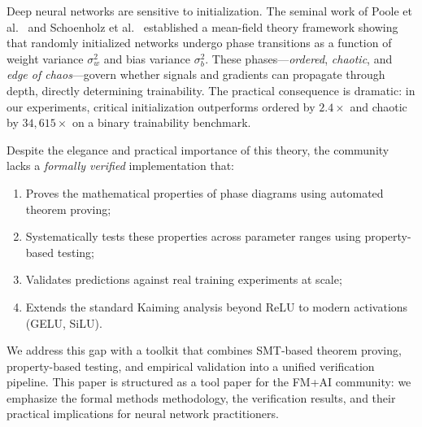 \documentclass[10pt]{article}
\begin{document}
Deep neural networks are sensitive to initialization.
The seminal work of Poole et al.~\cite{poole2016exponential} and Schoenholz et al.~\cite{schoenholz2017deep} established a mean-field theory framework showing that randomly initialized networks undergo phase transitions as a function of weight variance $\sigma_w^2$ and bias variance $\sigma_b^2$.
These phases---\emph{ordered}, \emph{chaotic}, and \emph{edge of chaos}---govern whether signals and gradients can propagate through depth, directly determining trainability.
The practical consequence is dramatic: in our experiments, critical initialization outperforms ordered by $2.4\times$ and chaotic by $34{,}615\times$ on a binary trainability benchmark.

Despite the elegance and practical importance of this theory, the community lacks a \emph{formally verified} implementation that:
\begin{enumerate}[nosep]
    \item Proves the mathematical properties of phase diagrams using automated theorem proving;
    \item Systematically tests these properties across parameter ranges using property-based testing;
    \item Validates predictions against real training experiments at scale;
    \item Extends the standard Kaiming analysis beyond ReLU to modern activations (GELU, SiLU).
\end{enumerate}

We address this gap with a toolkit that combines SMT-based theorem proving, property-based testing, and empirical validation into a unified verification pipeline.
This paper is structured as a tool paper for the FM+AI community: we emphasize the formal methods methodology, the verification results, and their practical implications for neural network practitioners.
\end{document}
